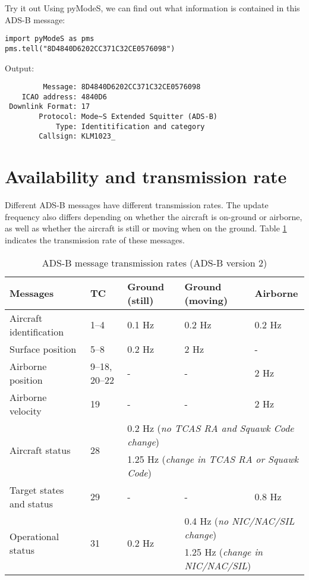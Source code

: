 \begin{notebox}{Try it out}
  Using pyModeS, we can find out what information is contained in this ADS-B message:

\begin{verbatim}
import pyModeS as pms
pms.tell("8D4840D6202CC371C32CE0576098")
\end{verbatim}

Output:

\begin{verbatim}
         Message: 8D4840D6202CC371C32CE0576098 
    ICAO address: 4840D6 
 Downlink Format: 17 
        Protocol: Mode~S Extended Squitter (ADS-B) 
            Type: Identitification and category 
        Callsign: KLM1023_ 
\end{verbatim}
  

\end{notebox}


\section{Availability and transmission rate}

Different ADS-B messages have different transmission rates. The update frequency also differs depending on whether the aircraft is on-ground or airborne, as well as whether the aircraft is still or moving when on the ground. Table \ref{tb:adsb-transmission-rate} indicates the transmission rate of these messages.

\begin{table}[ht]
  \footnotesize
  \centering
  \caption{ADS-B message transmission rates (ADS-B version 2)}
  \label{tb:adsb-transmission-rate}
  \begin{tabular}{|l|l|l|l|l|}
  \hline
  \textbf{Messages} & \textbf{TC} & \textbf{Ground (still)} & \textbf{Ground (moving)} & \textbf{Airborne} \\ \hline
  Aircraft identification & 1--4 & 0.1 Hz & 0.2 Hz & 0.2 Hz \\ \hline
  Surface position & 5--8 & 0.2 Hz & 2 Hz & - \\ \hline
  Airborne position & 9--18, 20--22 & - & - & 2 Hz \\ \hline
  Airborne velocity & 19 & - & - & 2 Hz \\ \hline
  \multirow{2}{*}{Aircraft status} & \multirow{2}{*}{28} & \multicolumn{3}{l|}{0.2 Hz (\textit{no TCAS RA and Squawk Code change})} \\ \cline{3-5} 
   &  & \multicolumn{3}{l|}{1.25 Hz (\textit{change in TCAS RA or Squawk Code})} \\ \hline
  Target states and status & 29 & - & - & 0.8 Hz \\ \hline
  \multirow{2}{*}{Operational status} & \multirow{2}{*}{31} & \multirow{2}{*}{0.2 Hz} & \multicolumn{2}{l|}{0.4 Hz (\textit{no NIC/NAC/SIL change})} \\ \cline{4-5} 
   &  &  & \multicolumn{2}{l|}{1.25 Hz (\textit{change in NIC/NAC/SIL})} \\ \hline
  \end{tabular}
\end{table}

